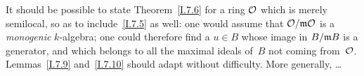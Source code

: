 \begin{remark}
It should be possible to state Theorem~\ref{I.7.6} for a ring
$\cal{O}$ which is merely semilocal, so as to include~\ref{I.7.5}
as well: one would assume that $\cal{O}/\goth{m}\cal{O}$ is a
\emph{monogenic} $k$-algebra; one could therefore find a
$u\in B$ whose image in $B/\goth{m}B$ is a generator, and
which belongs to all the maximal ideals of~$B$ not coming
from~$\cal{O}$. Lemmas~\ref{I.7.9} and~\ref{I.7.10} should
adapt without difficulty. More generally, \ldots
\end{remark}

